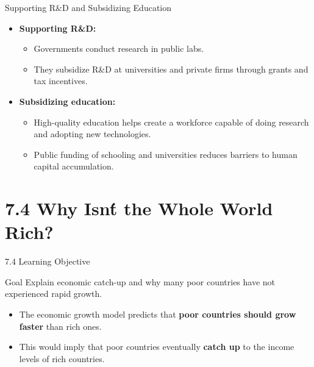 \documentclass[aspectratio=169]{beamer}
\begin{document}
\begin{frame}{Supporting R\&D and Subsidizing Education}
\transfade
\begin{itemize}[<+->]
  \item \textbf{Supporting R\&D:}
  \begin{itemize}[<+->]
    \item Governments conduct research in public labs.
    \item They subsidize R\&D at universities and private firms through grants and tax incentives.
  \end{itemize}
  \item \textbf{Subsidizing education:}
  \begin{itemize}[<+->]
    \item High-quality education helps create a workforce capable of doing research and adopting new technologies.
    \item Public funding of schooling and universities reduces barriers to human capital accumulation.
  \end{itemize}
\end{itemize}
\end{frame}

\section{7.4 Why Isn\'t the Whole World Rich?}

\begin{frame}{7.4 Learning Objective}
\transfade
\begin{block}{Goal}
Explain economic catch-up and why many poor countries have not experienced rapid growth.
\end{block}
\begin{itemize}[<+->]
  \item The economic growth model predicts that \textbf{poor countries should grow faster} than rich ones.
  \item This would imply that poor countries eventually \textbf{catch up} to the income levels of rich countries.
\end{itemize}
\end{frame}
\end{document}
